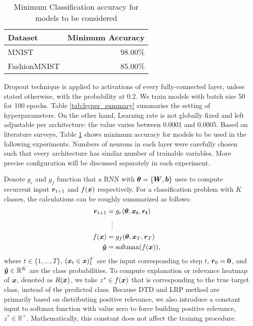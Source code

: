 \begin{table}[h]
\centering
\begin{tabular}{ll}
\multicolumn{1}{l|}{\textbf{Dataset}} & \textbf{Minimum Accuracy} \\ \hline
\multicolumn{1}{l|}{MNIST}            & \multicolumn{1}{r}{98.00\%}  \\
\multicolumn{1}{l|}{FashionMNIST}    & \multicolumn{1}{r}{85.00\%}  \\
\end{tabular}
\caption{Minimum Classification accuracy for models to be considered}
\label{tab:min_acc}
\end{table}



Dropout technique \cite{SrivastavaDropoutSimpleWay2014} is applied to activations of every fully-connected layer, unless stated otherwise,  with the probability at 0.2. We train models with batch size 50 for 100 epochs. Table \ref{tab:hyper_summary} summaries the setting of hyperparameters. On the other hand, Learning rate is not globally fixed and left adjustable per architecture: the value varies between 0.0001 and 0.0005. Based on literature surveys, Table \ref{tab:min_acc} shows minimum accuracy for models to be used in the following experiments.  Numbers of neurons in each layer were carefully chosen such that every architecture has similar number of trainable variables. More precise configuration will be discussed separately in each experiment. 

Denote $g_r$ and $g_{f}$ function that a RNN with $\boldsymbol{\theta} = \{ \patmatrix{W}, \boldsymbol{b} \}$ uses to compute recurrent input $\patvector{r}_{t+1}$ and $f(\boldsymbol{x})$ respectively. For a classification problem with $K$ classes, the calculations can be  roughly summarized as follows: 
 \begin{align*}
 	\patvector{r}_{t+1} &= g_r(\patvector{\theta}, \patvector{x_t}, \patvector{r_t}) \\
 	 &\ \ \vdots\\
f(\x) &= g_{f}(\patvector{\theta}, \patvector{x}_{T},  \patvector{r}_{T}) \\
 	\patvector{\hat{y}} &= \text{softmax}(f(\x)),
 \end{align*}
 where $t \in \{1, \dots, T\}$, $(\boldsymbol{x}_t \in \boldsymbol{x})_1^{T}$ are the input corresponding to  step $t$, $\patvector{r}_0 = \patvector{0}$, and $\patvector{\hat{y}} \in \mathbb{R}^K$ are the class probabilities. To compute explanation or relevance heatmap of $\boldsymbol{x}$, denoted as $R(\boldsymbol{x})$, we take $z^* \in f(\boldsymbol{x})$ that is corresponding to the true target class, instead of the predicted class.  Because DTD and LRP method are primarily  based on distributing positive relevance, we also introduce a constant input to softmax function with value zero to force building positive relevance, $z^* \in \mathbb{R}^+$. Mathematically, this constant does not affect the training procedure.

